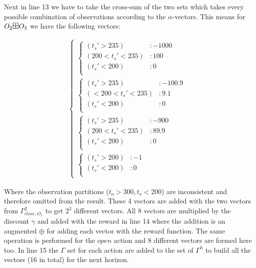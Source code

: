 \documentclass{article}
\begin{document}
Next in line 13 we have to take the cross-sum of the two sets which takes every possible combination of observations according to the $\alpha$-vectors. This means for $O_2 \textrm{\large $\boxplus$} O_3$ we have the following vectors: 

\begin{align*}
\begin{cases}
\begin{cases}
(t_s'>235) &: -1000 \\
(200<t_s'<235) &: 100 \\
(t_s'<200) &: 0 \\
\end{cases}
\\
\begin{cases}
(t_s'>235) &: -100.9 \\
(<200<t_s'<235) &: 9.1 \\
(t_s'<200) &: 0 \\
\end{cases}
\\
\begin{cases}
 (t_s'>235) &: -900 \\
 (200<t_s'<235) &: 89.9 \\
 (t_s'<200) &: 0 \\
\end{cases}
\\
\begin{cases}
(t_s'>200) &: -1 \\
(t_s'<200) &: 0 \\
\end{cases}
\end{cases}
\end{align*}

Where the observation partitions ($t_o>300 , t_o<200$) are inconsistent and therefore omitted from the result. These 4 vectors are added with the two vectors from $\Gamma_{close,O_1}^2$ to get $2^3$ different vectors. All 8 vectors are multiplied by the discount $\gamma$ and added with the reward in line 14 where the addition is an augmented $\oplus$ for adding each vector with the reward function. 
The same operation is performed for the $open$ action and 8 different vectors are formed here too. In line 15 the $\Gamma$ set for each action are added to the set of $\Gamma^h$ to build all the vectors (16 in total) for the next horizon. 
\end{document}
